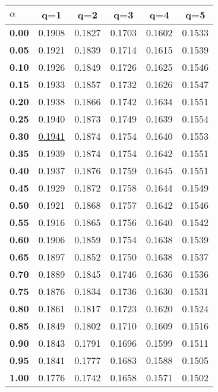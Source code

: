 \begin{tabular}{ | l || c | c | c | c | c |}
\hline
\textbf{$\alpha$} & \textbf{}q=1} & \textbf{}q=2} & \textbf{}q=3} & \textbf{}q=4} & \textbf{}q=5} \\
\hline
\textbf{0.00} & 0.1908 & 0.1827 & 0.1703 & 0.1602 & 0.1533\\
\hline
\textbf{0.05} & 0.1921 & 0.1839 & 0.1714 & 0.1615 & 0.1539\\
\hline
\textbf{0.10} & 0.1926 & 0.1849 & 0.1726 & 0.1625 & 0.1546\\
\hline
\textbf{0.15} & 0.1933 & 0.1857 & 0.1732 & 0.1626 & 0.1547\\
\hline
\textbf{0.20} & 0.1938 & 0.1866 & 0.1742 & 0.1634 & 0.1551\\
\hline
\textbf{0.25} & 0.1940 & 0.1873 & 0.1749 & 0.1639 & 0.1554\\
\hline
\textbf{0.30} & \underline{0.1941} & 0.1874 & 0.1754 & 0.1640 & 0.1553\\
\hline
\textbf{0.35} & 0.1939 & 0.1874 & 0.1754 & 0.1642 & 0.1551\\
\hline
\textbf{0.40} & 0.1937 & 0.1876 & 0.1759 & 0.1645 & 0.1551\\
\hline
\textbf{0.45} & 0.1929 & 0.1872 & 0.1758 & 0.1644 & 0.1549\\
\hline
\textbf{0.50} & 0.1921 & 0.1868 & 0.1757 & 0.1642 & 0.1546\\
\hline
\textbf{0.55} & 0.1916 & 0.1865 & 0.1756 & 0.1640 & 0.1542\\
\hline
\textbf{0.60} & 0.1906 & 0.1859 & 0.1754 & 0.1638 & 0.1539\\
\hline
\textbf{0.65} & 0.1897 & 0.1852 & 0.1750 & 0.1638 & 0.1537\\
\hline
\textbf{0.70} & 0.1889 & 0.1845 & 0.1746 & 0.1636 & 0.1536\\
\hline
\textbf{0.75} & 0.1876 & 0.1834 & 0.1736 & 0.1630 & 0.1531\\
\hline
\textbf{0.80} & 0.1861 & 0.1817 & 0.1723 & 0.1620 & 0.1524\\
\hline
\textbf{0.85} & 0.1849 & 0.1802 & 0.1710 & 0.1609 & 0.1516\\
\hline
\textbf{0.90} & 0.1843 & 0.1791 & 0.1696 & 0.1599 & 0.1511\\
\hline
\textbf{0.95} & 0.1841 & 0.1777 & 0.1683 & 0.1588 & 0.1505\\
\hline
\textbf{1.00} & 0.1776 & 0.1742 & 0.1658 & 0.1571 & 0.1502\\
\hline
\end{tabular}

